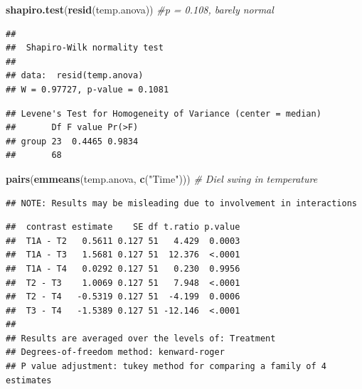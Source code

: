 \documentclass[
]{article}
\newenvironment{Shaded}{\begin{snugshade}}{\end{snugshade}}
\newcommand{\CommentTok}[1]{\textcolor[rgb]{0.56,0.35,0.01}{\textit{#1}}}
\newcommand{\FunctionTok}[1]{\textcolor[rgb]{0.13,0.29,0.53}{\textbf{#1}}}
\newcommand{\NormalTok}[1]{#1}
\newcommand{\SpecialCharTok}[1]{\textcolor[rgb]{0.81,0.36,0.00}{\textbf{#1}}}
\newcommand{\StringTok}[1]{\textcolor[rgb]{0.31,0.60,0.02}{#1}}
\begin{document}
\begin{Shaded}
\begin{Highlighting}[]
\FunctionTok{shapiro.test}\NormalTok{(}\FunctionTok{resid}\NormalTok{(temp.anova)) }\CommentTok{\#p = 0.108, barely normal}
\end{Highlighting}
\end{Shaded}

\begin{verbatim}
## 
##  Shapiro-Wilk normality test
## 
## data:  resid(temp.anova)
## W = 0.97727, p-value = 0.1081
\end{verbatim}

\begin{Shaded}
\end{Shaded}

\begin{verbatim}
## Levene's Test for Homogeneity of Variance (center = median)
##       Df F value Pr(>F)
## group 23  0.4465 0.9834
##       68
\end{verbatim}

\begin{Shaded}
\begin{Highlighting}[]
\FunctionTok{pairs}\NormalTok{(}\FunctionTok{emmeans}\NormalTok{(temp.anova, }\FunctionTok{c}\NormalTok{(}\StringTok{"Time"}\NormalTok{))) }\CommentTok{\# Diel swing in temperature}
\end{Highlighting}
\end{Shaded}

\begin{verbatim}
## NOTE: Results may be misleading due to involvement in interactions
\end{verbatim}

\begin{verbatim}
##  contrast estimate    SE df t.ratio p.value
##  T1A - T2   0.5611 0.127 51   4.429  0.0003
##  T1A - T3   1.5681 0.127 51  12.376  <.0001
##  T1A - T4   0.0292 0.127 51   0.230  0.9956
##  T2 - T3    1.0069 0.127 51   7.948  <.0001
##  T2 - T4   -0.5319 0.127 51  -4.199  0.0006
##  T3 - T4   -1.5389 0.127 51 -12.146  <.0001
## 
## Results are averaged over the levels of: Treatment 
## Degrees-of-freedom method: kenward-roger 
## P value adjustment: tukey method for comparing a family of 4 estimates
\end{verbatim}
\end{document}
